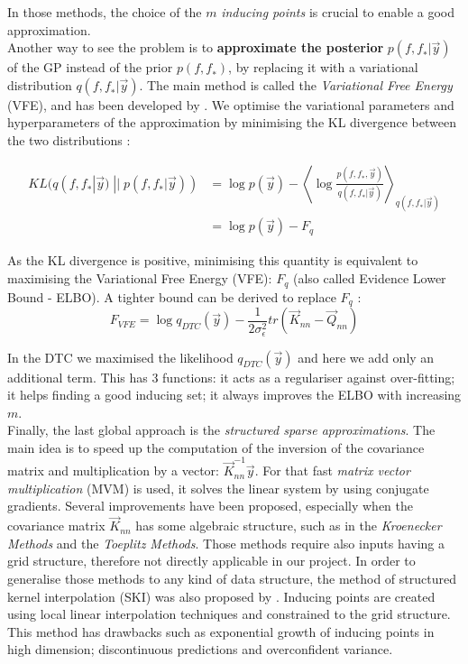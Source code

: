 In those methods, the choice of the $m$ \textit{inducing points} is crucial to enable a good approximation. \\


Another way to see the problem is to \textbf{approximate the posterior} $p(\mathit{f,f_*} | \vec{y})$ of the GP instead of the prior $p(\mathit{f,f_*})$, by replacing it with a variational distribution  $q(\mathit{f,f_*} | \vec{y})$. The main method is called the \textit{Variational Free Energy} (VFE), and has been developed by \cite{titsias_variational_2009}. We optimise the variational parameters and hyperparameters of the  approximation by minimising the KL divergence between the two distributions : 


\begin{align}
    KL(q(\mathit{f,f_*} | \vec{y})\; || \;  p(\mathit{f,f_*} | \vec{y})) &= \log p(\vec{y}) - \left\langle  \log \frac{p(\mathit{f,f_*},\vec{y})}{q(\mathit{f,f_*} | \vec{y})}\right\rangle_{q(\mathit{f,f_*} | \vec{y})} \\
    &= \log p(\vec{y}) - F_q
    \label{equ:vfe_kl}
    \end{align}  
    
As the KL divergence is positive, minimising this quantity is equivalent to maximising the Variational Free Energy (VFE): $F_q$ (also called Evidence Lower Bound - ELBO). A tighter bound can be derived to replace $F_q$ : 
\begin{equation}
    F_{VFE} = \log q_{DTC}(\vec{y}) - \frac{1}{2\sigma_\epsilon^2} tr(\vec{K}_{nn} - \vec{Q}_{nn})
\end{equation}

In the DTC we maximised the likelihood $q_{DTC}(\vec{y})$ and here we add only an additional term. This has 3 functions: it acts as a regulariser against over-fitting; it helps finding a good inducing set; it always improves the ELBO with increasing $m$.  \\

Finally, the last global approach is the \textit{structured sparse approximations}. The main idea is to speed up the computation of the inversion of the covariance matrix and multiplication by a vector: $\vec{K}_{nn}^{-1}\vec{y}$. For that fast \textit{matrix vector multiplication} (MVM) is used, it solves the linear system by using conjugate gradients. Several improvements have been proposed, especially when the covariance matrix $\vec{K}_{nn}$ has some algebraic structure, such as in the \textit{Kroenecker Methods} and the \textit{Toeplitz Methods}. Those methods require also inputs having a grid structure, therefore not directly applicable in our project.  In order to generalise those methods to any kind of data structure, the method of structured kernel interpolation (SKI) was also proposed by \citet{wilson_kernel_2015}. Inducing points are created using local linear interpolation techniques and constrained to the grid structure. This method has drawbacks such as exponential growth of inducing points in high dimension; discontinuous predictions and overconfident variance. 


